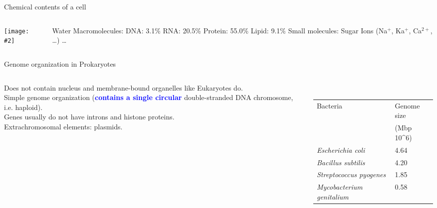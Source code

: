 \documentclass{beamer}
\renewcommand{\c}[1]{\begin{center}#1\end{center}}
\newcommand{\blu}[1]{\textcolor{blue}{\textbf{#1}}}
\newcommand{\gr}[2][.95]{\c{\texttt{[image: \#2]}}}
\begin{document}
\begin{frame}{Chemical contents of a cell}
\begin{columns}
    \begin{column}{0.4\textwidth}
        \gr{l1_figs/s7_cell.png}
    \end{column}
    \begin{column}{0.6\textwidth}
        \begin{outline}
            \1[] Water
            \1[] Macromolecules:
                \2 DNA: 3.1\%
                \2 RNA: 20.5\%
                \2 Protein: 55.0\%
                \2 Lipid: 9.1\%
            \1[] Small molecules:
                \2 Sugar
                \2 Ions (Na$^+$, Ka$^+$, Ca$^{2+}$, \ldots)
                \2 \ldots
        \end{outline}
    \end{column}
\end{columns}
\end{frame}

\begin{frame}{Genome organization in Prokaryotes}
\begin{columns}
\begin{column}{0.6\textwidth}
    Does not contain nucleus and membrane-bound organelles like Eukaryotes do.\\
    \bigskip
    Simple genome organization (\blu{contains a single circular} double-stranded DNA chromosome, i.e. haploid).\\
    \bigskip
    Genes usually do not have introns and histone proteins.\\
    \bigskip
    Extrachromosomal elements: plasmids.
\end{column}
\begin{column}{0.4\textwidth}
\c{
    \fbox{\gr{l1_figs/s8_prok.png}}\\
    \bigskip
    \tiny
    \begin{tabular}{|l|l|}
        \hline
        Bacteria & Genome size\\
        & (Mbp 10^6)\\
        \hline
        \textit{Escherichia coli} & 4.64\\
        \textit{Bacillus subtilis} & 4.20\\
        \textit{Streptococcus pyogenes} & 1.85\\
        \textit{Mycobacterium genitalium} & 0.58\\
        \hline
    \end{tabular}
}
\end{column}\end{columns}
\end{frame}
\end{document}

